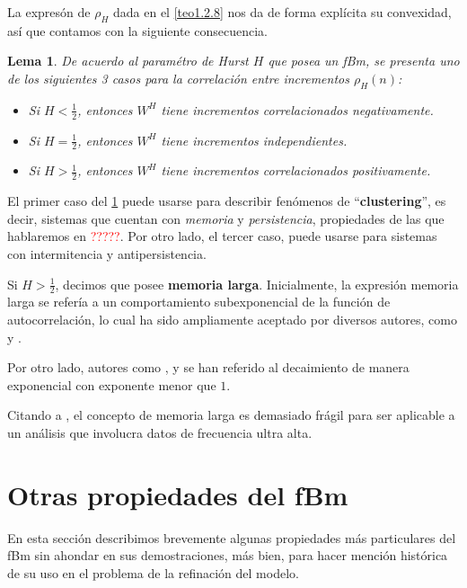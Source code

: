 \documentclass[letterpaper,12pt,oneside]{book}
\theoremstyle{plain}
\newtheorem{lem}[theorem]{Lema}
\numberwithin{theorem}{section}
\begin{document}
La expresón de $\rho_H$ dada en el \cref{teo1.2.8} nos da de forma explícita su convexidad, así que contamos con la siguiente consecuencia.
\begin{lem}\label{lem1.2.9}
	De acuerdo al paramétro de Hurst $H$ que posea un fBm, se presenta uno de los siguientes 3 casos para la correlación entre incrementos $\rho_H(n)$:
	\begin{itemize}
		\item Si $H<\frac{1}{2}$, entonces $W^H$ tiene incrementos correlacionados negativamente.
		\item Si $H=\frac{1}{2}$, entonces $W^H$ tiene incrementos independientes.
		\item Si $H>\frac{1}{2}$, entonces $W^H$ tiene incrementos correlacionados positivamente.
	\end{itemize}
\end{lem}
El primer caso del \cref{lem1.2.9} puede usarse para describir fenómenos de ``\textbf{clustering}'', es decir, sistemas que cuentan con \textsl{memoria} y \textsl{persistencia}, propiedades de las que hablaremos en \textcolor{red}{?????}. Por otro lado, el tercer caso, puede usarse para sistemas  con intermitencia y antipersistencia.

Si $H>\frac{1}{2}$, decimos que posee \textbf{memoria larga}.
Inicialmente, la expresión memoria larga se refería a un comportamiento subexponencial de la función de autocorrelación, lo cual ha sido ampliamente aceptado por diversos autores, como \cite{ding_long_1993} y \cite{andersen_modeling_2003}.

Por otro lado, autores como \cite{chen_persistence_2006}, \cite{bentes_is_2011} y \cite{chronopoulou_parameter_2011} se han referido al decaimiento de manera  exponencial con exponente menor que $1$.

Citando a \cite{gatheral_volatility_2018}, el concepto de memoria larga es demasiado frágil para ser aplicable a un análisis que involucra datos de frecuencia ultra alta.%
\section{Otras propiedades del fBm}
En esta sección describimos brevemente algunas propiedades más particulares del fBm sin ahondar en sus demostraciones, más bien, para hacer mención histórica de su uso en el problema de la refinación del modelo. 
\end{document}
